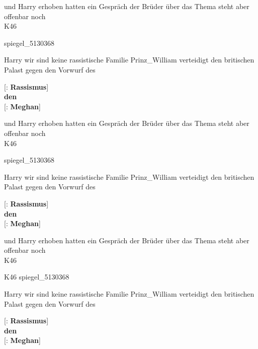 und Harry erhoben hatten ein Gespräch der Brüder über das Thema steht aber offenbar noch \\

K46
\z

\ea
spiegel\_5130368\\\medskip

Harry wir sind keine rassistische Familie Prinz\_William verteidigt den britischen Palast gegen den Vorwurf des\\\medskip

{[}: \textbf{Rassismus}{]}\\
\textbf{den}\\
{[}: \textbf{Meghan}{]}\\\medskip

und Harry erhoben hatten ein Gespräch der Brüder über das Thema steht aber offenbar noch \\

K46
\z


\ea
spiegel\_5130368\\\medskip

Harry wir sind keine rassistische Familie Prinz\_William verteidigt den britischen Palast gegen den Vorwurf des\\\medskip

\hfill {[}: \textbf{Rassismus}{]}\\
\hfill \textbf{den}\\
\hfill {[}: \textbf{Meghan}{]}\\\medskip

und Harry erhoben hatten ein Gespräch der Brüder über das Thema steht aber offenbar noch \\

K46
\z


\newpage
\ea
K46 spiegel\_5130368\\\medskip

Harry wir sind keine rassistische Familie Prinz\_William verteidigt den britischen Palast gegen den Vorwurf des\\\medskip

\hfill {[}: \textbf{Rassismus}{]}\hfill~\\
\hfill \textbf{den}\hfill~\\
\hfill {[}: \textbf{Meghan}{]}\hfill~\\\medskip

